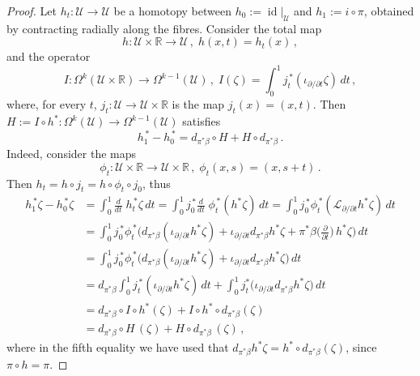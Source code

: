 \documentclass{amsart}
\DeclareMathOperator{\id}{id}
\theoremstyle{remark}
\begin{document}
\begin{proof}
Let $h_t: \mathcal{U} \rightarrow \mathcal{U}$
be a homotopy between $h_0 := \left. \id \right\lvert_{\mathcal{U}}$
and $h_1 := i \circ \pi$,
obtained by contracting radially along the fibres.
Consider the total map
$$
h: \mathcal{U} \times \mathbb{R} \rightarrow \mathcal{U} \,,\; h (x,t) = h_t (x) \,,
$$
and the operator
$$
I: \Omega^k (\mathcal{U} \times \mathbb{R}) \rightarrow \Omega^{k-1} (\mathcal{U}) \,,\;
I (\zeta) = \int_0^1 j_t^{\,\ast} (\iota_{\partial / \partial t} \zeta) \, dt \,,
$$
where, for every $t$,
$j_t: \mathcal{U} \rightarrow \mathcal{U} \times \mathbb{R}$
is the map $j_t (x) = (x, t)$.
Then $H := I \circ h^{\ast}:
\Omega^k (\mathcal{U}) \rightarrow \Omega^{k-1} (\mathcal{U})$
satisfies
$$
h_1^{\,\ast} - h_0^{\,\ast} = d_{\pi^{\ast}\beta} \circ H + H \circ d_{\pi^{\ast}\beta} \,.
$$
Indeed, 
consider the maps
$$
\phi_t: \mathcal{U} \times \mathbb{R} \rightarrow \mathcal{U} \times \mathbb{R} \,,\;
\phi_t (x, s) = (x, s + t) \,.
$$
Then $h_t = h \circ j_t = h \circ \phi_t \circ j_0$,
thus
\begin{align*}
h_1^{\,\ast} \zeta - h_0^{\,\ast} \zeta
&= \int_0^1 \frac{d}{dt} \; h_t^{\,\ast} \zeta \, dt
= \int_0^1 j_0^{\,\ast} \frac{d}{dt} \; \phi_t^{\,\ast}  (h^{\ast}\zeta) \, dt
=  \int_0^1 j_0^{\,\ast} \phi_t^{\,\ast} (\mathcal{L}_{\partial/\partial t} h^{\ast}\zeta) \, dt \\
&=  \int_0^1 j_0^{\,\ast} \phi_t^{\,\ast}
\Big( d_{\pi^{\ast}\beta}(\iota_{\partial/\partial t} h^{\ast}\zeta)
+ \iota_{\partial/\partial t} d_{\pi^{\ast}\beta} h^{\ast}\zeta
+ \pi^{\ast} \beta \big(\frac{\partial}{\partial t}\big) \, h^{\ast}\zeta
\Big) \, dt \\
&=  \int_0^1 j_0^{\,\ast} \phi_t^{\,\ast}
\big( d_{\pi^{\ast}\beta}(\iota_{\partial/\partial t} h^{\ast}\zeta)
+ \iota_{\partial/\partial t} d_{\pi^{\ast}\beta} h^{\ast}\zeta
\big) \, dt \\
&=  d_{\pi^{\ast}\beta} \int_0^1 j_t^{\,\ast} (\iota_{\partial/\partial t} h^{\ast}\zeta) \, dt
+  \int_0^1 j_t^{\ast} \big(\iota_{\partial/\partial t} d_{\pi^{\ast}\beta} h^{\ast}\zeta \big)  \, dt \\
&= d_{\pi^{\ast}\beta} \circ I \circ h^{\ast} (\zeta)
+ I \circ h^{\ast} \circ d_{\pi^{\ast}\beta} (\zeta) \\
&= d_{\pi^{\ast}\beta} \circ H \, (\zeta) + H \circ d_{\pi^{\ast}\beta} \, (\zeta) \,,
\end{align*}
where in the fifth equality we have used
that $d_{\pi^{\ast}\beta} h^{\ast} \zeta = h^{\ast} \circ d_{\pi^{\ast}\beta} (\zeta)$,
since $\pi \circ h = \pi$.


\end{proof}
\end{document}
